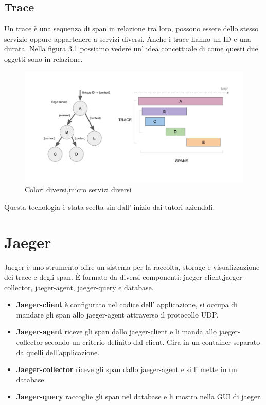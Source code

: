 \documentclass[a4paper,12pt,titlepage,italian,openany]{report}
\begin{document}
\subsection{Trace}
Un trace è una sequenza di span in relazione tra loro, possono essere dello stesso servizio oppure appartenere a servizi diversi. Anche i trace hanno un ID e una durata.
Nella figura 3.1 possiamo vedere un' idea concettuale di come questi due oggetti sono in relazione.

\begin{figure}[H]
    
    \includegraphics[scale=0.4]{1.png}
    \centering
    \caption{Colori diversi,micro servizi diversi}
\end{figure}
Questa tecnologia è stata scelta sin dall' inizio dai tutori aziendali.
\section{Jaeger}

Jaeger\cite{jaeger:1} è uno strumento offre un sistema per la raccolta, storage e visualizzazione dei trace e degli span.
È formato da diversi componenti: jaeger-client,jaeger-collector, jaeger-agent, jaeger-query e database.
\begin{itemize}
    \item{\textbf{Jaeger-client}} è configurato nel codice dell' applicazione, si occupa di mandare gli span allo jaeger-agent attraverso il protocollo UDP.
    \item {\textbf{Jaeger-agent}} riceve gli span dallo jaeger-client e li manda allo jaeger-collector secondo un criterio definito dal client. Gira in un container separato da quelli dell'applicazione.
    \item {\textbf{Jaeger-collector}} riceve gli span dallo jaeger-agent e si li mette in un database.
    \item {\textbf{Jaeger-query}} raccoglie gli span nel database e li mostra nella GUI di jaeger.
\end{itemize}
\end{document}
